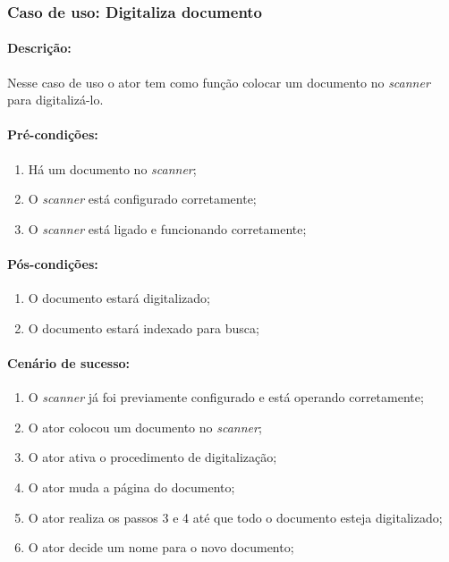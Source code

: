 \subsubsection{Caso de uso: Digitaliza documento}

\paragraph{Descrição:}
Nesse caso de uso o ator tem como função colocar um documento no {\it scanner} para digitalizá-lo.

\paragraph{Pré-condições:}
\begin{enumerate}
    \item Há um documento no {\it scanner};
    \item O {\it scanner} está configurado corretamente;
    \item O {\it scanner} está ligado e funcionando corretamente;
\end{enumerate}

\paragraph{Pós-condições:} 
\begin{enumerate}
    \item O documento estará digitalizado;
    \item O documento estará indexado para busca;
\end{enumerate}

\paragraph{Cenário de sucesso:}
\begin{enumerate}
    \item O {\it scanner} já foi previamente configurado e está operando corretamente;
    \item O ator colocou um documento no {\it scanner};
    \item O ator ativa o procedimento de digitalização;
    \item O ator muda a página do documento;
    \item O ator realiza os passos 3 e 4 até que todo o documento esteja digitalizado;
    \item O ator decide um nome para o novo documento;
\end{enumerate}

